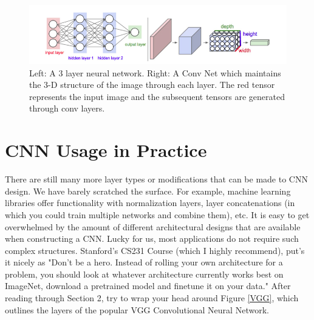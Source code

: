 \documentclass[11pt]{article}
\begin{document}
\begin{figure}
    \begin{center}
        \includegraphics[width=\textwidth]{layers.png}
        \vspace{-10pt}
        \caption{Left: A 3 layer neural network. Right: A Conv Net which maintains the 3-D structure of the image through each layer. The red tensor represents the input image and the subsequent tensors are generated through conv layers.}
    \end{center}
    \vspace{-25pt}
\end{figure}


\section{CNN Usage in Practice}
There are still many more layer types or modifications that can be made to CNN design. We have barely scratched the surface. For example, machine learning libraries offer functionality with normalization layers, layer concatenations (in which you could train multiple networks and combine them), etc. It is easy to get overwhelmed by the amount of different architectural designs that are available when constructing a CNN. Lucky for us, most applications do not require such complex structures. Stanford's CS231 Course (which I highly recommend), put's it nicely as "Don't be a hero. Instead of rolling your own architecture for a problem, you should look at whatever architecture currently works best on ImageNet, download a pretrained model and finetune it on your data." After reading through Section 2, try to wrap your head around Figure \ref{VGG}, which outlines the layers of the popular VGG Convolutional Neural Network.
\end{document}
